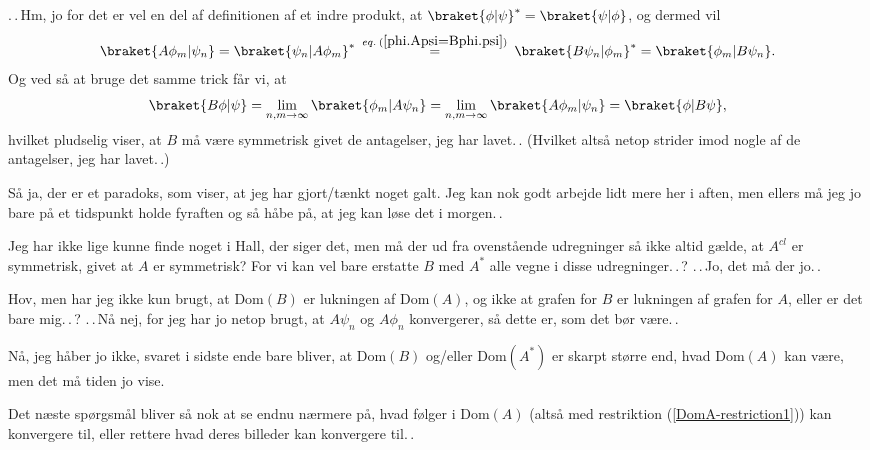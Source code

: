 \documentclass{report}
\begin{document}
.\,.\,Hm, jo for det er vel en del af definitionen af et indre produkt, at $\braket{\phi|\psi}^*=\braket{\psi|\phi}$, og dermed vil 
\begin{align}
\begin{aligned}
	\braket{A \phi_m|\psi_n} = \braket{\psi_n|A \phi_m}^* 
	\:\stackrel{eq.\: (\ref{phi.Apsi=Bphi.psi})}{=}\:
	\braket{B \psi_n| \phi_m}^* = \braket{\phi_m| B\psi_n}.
\end{aligned}
\end{align}
Og ved så at bruge det samme trick får vi, at
\begin{align}
\begin{aligned}
	\braket{B \phi | \psi} = 
	\lim_{n,m\to \infty} \braket{\phi_m | A \psi_n} = 
	\lim_{n,m\to \infty} \braket{A \phi_m | \psi_n} =
	\braket{\phi | B \psi},
	\label{B-seemingly-symmetric}
\end{aligned}
\end{align}
hvilket pludselig viser, at $B$ må være symmetrisk givet de antagelser, jeg har lavet.\,. (Hvilket altså netop strider imod nogle af de antagelser, jeg har lavet.\,.)

Så ja, der er et paradoks, som viser, at jeg har gjort/tænkt noget galt. Jeg kan nok godt arbejde lidt mere her i aften, men ellers må jeg jo bare på et tidspunkt holde fyraften og så håbe på, at jeg kan løse det i morgen.\,. 

Jeg har ikke lige kunne finde noget i Hall, der siger det, men må der ud fra ovenstående udregninger så ikke altid gælde, at $A^{cl}$ er symmetrisk, givet at $A$ er symmetrisk? For vi kan vel bare erstatte $B$ med $A^*$ alle vegne i disse udregninger.\,.\,? .\,.\,Jo, det må der jo.\,. 

Hov, men har jeg ikke kun brugt, at Dom$(B)$ er lukningen af Dom$(A)$, og ikke at grafen for $B$ er lukningen af grafen for $A$, eller er det bare mig.\,.\,? .\,.\,Nå nej, for jeg har jo netop brugt, at $A\psi_n$ og $A\phi_n$ konvergerer, så dette er, som det bør være.\,. 


Nå, jeg håber jo ikke, svaret i sidste ende bare bliver, at Dom$(B)$ og/eller Dom$(A^*)$ er skarpt større end, hvad Dom$(A)$ kan være, men det må tiden jo vise. 

Det næste spørgsmål bliver så nok at se endnu nærmere på, hvad følger i Dom$(A)$ (altså med restriktion (\ref{DomA-restriction1})) kan konvergere til, eller rettere hvad deres billeder kan konvergere til.\,.
\end{document}
